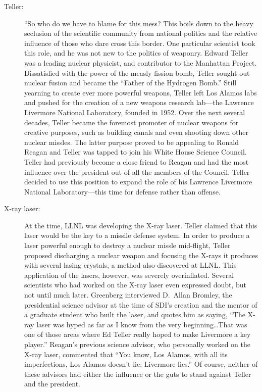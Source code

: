 \documentclass[12pt]{article}
\begin{document}
\begin{description}
\begin{description}
      \item[Teller:] ``So who do we have to blame for this mess? This boils
        down to the heavy seclusion of the scientific community from national
        politics and the relative influence of those who dare cross this
        border. One particular scientist took this role, and he was not new to
        the politics of weaponry. Edward Teller was a leading nuclear
        physicist, and contributor to the Manhattan Project. Dissatisfied with
        the power of the measly fission bomb, Teller sought out nuclear fusion
        and became the ``Father of the Hydrogen Bomb.'' Still yearning to
        create ever more powerful weapons, Teller left Los Alamos labs and
        pushed for the creation of a new weapons research lab---the Lawrence
        Livermore National Laboratory, founded in 1952. Over the next several
        decades, Teller became the foremost promoter of nuclear weapons for
        creative purposes, such as building canals and even shooting down other
        nuclear missles. The latter purpose proved to be appealing to Ronald
        Reagan and Teller was tapped to join his White House Science Council.
        Teller had previously become a close friend to Reagan and had the most
        influence over the president out of all the members of the Council.
        Teller decided to use this position to expand the role of his Lawrence
        Livermore National Laboratory---this time for defense rather than
        offense.

      \item[X-ray laser:] At the time, LLNL was developing the X-ray laser.
        Teller claimed that this laser would be the key to a missile defense
        system. In order to produce a laser powerful enough to destroy a
        nuclear missle mid-flight, Teller proposed discharging a nuclear weapon
        and focusing the X-rays it produces with several lasing crystals, a
        method also discovered at LLNL. This application of the lasers,
        however, was severely overinflated. Several scientists who had worked
        on the X-ray laser even expressed doubt, but not until much later.
        Greenberg interviewed D.\ Allan Bromley, the presidential science
        advisor at the time of SDI's creation and the mentor of a graduate
        student who built the laser, and quotes him as saying, ``The X-ray
        laser was hyped as far as I know from the very beginning\ldots That was
        one of those areas where Ed Teller really hoped to make Livermore a key
        player.'' Reagan's previous science advisor, who personally worked on
        the X-ray laser, commented that ``You know, Los Alamos, with all its
        imperfections, Los Alamos doesn't lie; Livermore lies.'' Of course,
        neither of these advisors had either the influence or the guts to stand
        against Teller and the president.


\end{description}
\end{description}
\end{document}
